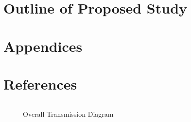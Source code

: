 \documentclass[titlepage]{article}
\begin{document}
\section{Outline of Proposed Study}

\clearpage

\section{Appendices}

\clearpage

\section{References}



{}

\clearpage

\begin{lstlisting}

\end{lstlisting}

\begin{figure}[htb]                                                                       
  \begin{center}
  \end{center}
  \caption{Overall Transmission Diagram}
  \label{fig:transmission}
\end{figure}
\end{document}

